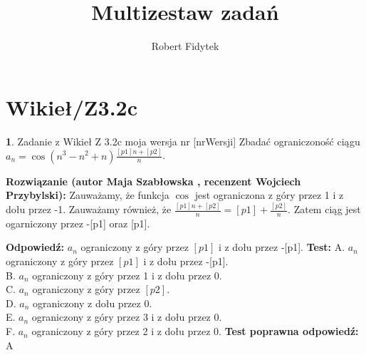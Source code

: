 \documentclass[12pt, a4paper]{article}
\title{Multizestaw zadań}
\author{Robert Fidytek}
\date{}
\theoremstyle{definition} %
\newtheorem{zad}{}
\newcommand{\kategoria}[1]{\section{#1}} %
\newcommand{\zadStart}[1]{\begin{zad}#1\newline} %
\newcommand{\zadStop}{\end{zad}}   %
\newcommand{\rozwStart}[2]{\noindent \textbf{Rozwiązanie (autor #1 , recenzent #2): }\newline} %
\newcommand{\rozwStop}{\newline}                                            %
\newcommand{\odpStart}{\noindent \textbf{Odpowiedź:}\newline}    %
\newcommand{\odpStop}{\newline}                                             %
\newcommand{\testStart}{\noindent \textbf{Test:}\newline} %
\newcommand{\testStop}{\newline} %
\newcommand{\kluczStart}{\noindent \textbf{Test poprawna odpowiedź:}\newline} %
\newcommand{\kluczStop}{\newline} %
\begin{document}
\maketitle


\kategoria{Wikieł/Z3.2c}
\zadStart{Zadanie z Wikieł Z 3.2c moja wersja nr [nrWersji]}
Zbadać ograniczoność ciągu $a_{n}=\cos(n^{3}-n^{2}+n)\frac{[p1]n+[p2]}{n}$.
\zadStop

\rozwStart{Maja Szabłowska}{Wojciech Przybylski}
Zauważamy, że funkcja $\cos$ jest ograniczona z góry przez 1 i z dołu przez -1. 
Zauważamy również, że $\frac{[p1]n+[p2]}{n}=[p1]+\frac{[p2]}{n}.$ Zatem ciąg jest ogarniczony przez -[p1] oraz [p1].
\rozwStop


\odpStart
$a_{n}$ ograniczony z góry przez $[p1]$ i z dołu przez -[p1].
\odpStop
\testStart
A. $a_{n}$ ograniczony z góry przez $[p1]$ i z dołu przez -[p1].\\
B. $a_{n}$ ograniczony z góry przez 1 i z dołu przez 0.\\
C. $a_{n}$ ograniczony z góry przez $[p2]$.\\
D. $a_{n}$ ograniczony z dołu przez 0.\\
E. $a_{n}$ ograniczony z góry przez 3 i z dołu przez 0.\\
F. $a_{n}$ ograniczony z góry przez 2 i z dołu przez 0.
\testStop
\kluczStart
A
\kluczStop
\end{document}
